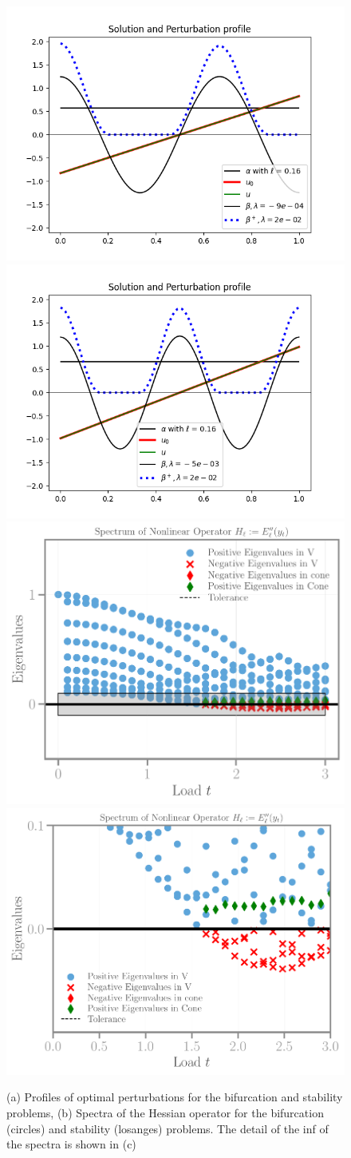 

\begin{figure}[htbp]
    \centering
    \includegraphics*[width=.45\textwidth]{final_images/damage_profile-16.png}
    \includegraphics*[width=.45\textwidth]{final_images/damage_profile-19.png}\\
    \includegraphics*[width=.45\textwidth]{final_images/spectra-7f4361886184f3c6791fe16bf4f4b3f2.pdf}
    \includegraphics*[width=.45\textwidth]{final_images/spectra-zoom-7f4361886184f3c6791fe16bf4f4b3f2.pdf}
    \caption{(a) Profiles of optimal perturbations for the bifurcation and stability problems, (b) Spectra of the Hessian operator for the bifurcation (circles) and stability (losanges) problems. The detail of the inf of the spectra is shown in (c)}
    \label{fig:irreversibility}
\end{figure}


